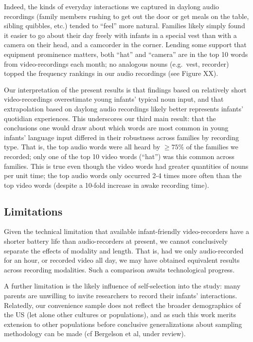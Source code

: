 \documentclass[floatsintext,man]{apa6}
\theoremstyle{definition}
\theoremstyle{definition}
\theoremstyle{definition}
\theoremstyle{remark}
\begin{document}
Indeed, the kinds of everyday interactions we captured in daylong audio
recordings (family members rushing to get out the door or get meals on
the table, sibling quibbles, etc.) tended to \enquote{feel} more
natural. Families likely simply found it easier to go about their day
freely with infants in a special vest than with a camera on their head,
and a camcorder in the corner. Lending some support that equipment
prominence matters, both \enquote{hat} and \enquote{camera} are in the
top 10 words from video-recordings each month; no analogous nouns
(e.g.~vest, recorder) topped the frequency rankings in our audio
recordings (see Figure XX).

Our interpretation of the present results is that findings based on
relatively short video-recordings overestimate young infants' typical
noun input, and that extrapolation based on daylong audio recordings
likely better represents infants' quotidian experiences. This
underscores our third main result: that the conclusions one would draw
about which words are most common in young infants' language input
differed in their robustness across families by recording type. That is,
the top audio words were all heard by \(\geq 75\%\) of the families we
recorded; only one of the top 10 video words (\enquote{hat}) was this
common across families. This is true even though the video words had
greater quantities of nouns per unit time; the top audio words only
occurred 2-4 times more often than the top video words (despite a
10-fold increase in awake recording time).

\hypertarget{limitations}{%
\subsection{Limitations}\label{limitations}}

Given the technical limitation that available infant-friendly
video-recorders have a shorter battery life than audio-recorders at
present, we cannot conclusively separate the effects of modality and
length. That is, had we only audio-recorded for an hour, or recorded
video all day, we may have obtained equivalent results across recording
modalities. Such a comparison awaits technological progress.

A further limitation is the likely influence of self-selection into the
study: many parents are unwilling to invite researchers to record their
infants' interactions. Relatedly, our convenience sample does not
reflect the broader demographics of the US (let alone other cultures or
populations), and as such this work merits extension to other
populations before conclusive generalizations about sampling methodology
can be made (cf Bergelson et al, under review).
\end{document}
